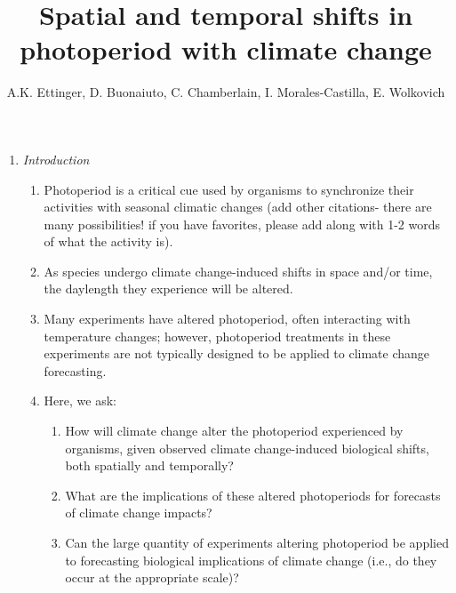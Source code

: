 \documentclass{article}
\begin{document}
 
\title{Spatial and temporal shifts in photoperiod with climate change} %

\author{A.K. Ettinger, D. Buonaiuto, C. Chamberlain, I. Morales-Castilla, E. Wolkovich}
\maketitle  %
\begin{enumerate}
\item \textit{Introduction}
\begin{enumerate}
\item Photoperiod is a critical cue used by organisms to synchronize their activities with seasonal climatic changes (add other citations- there are many possibilities! if you have favorites, please add along with 1-2 words of what the activity is)\citep[e.g.,][]{Hsu:2011,Singh:2017,Basler:2012,Flynn:2018}.
\item As species undergo climate change-induced shifts in space and/or time, the daylength they experience will be altered. 
\item Many experiments have altered photoperiod, often interacting with temperature changes; however, photoperiod treatments in these experiments are not typically designed to be applied to climate change forecasting. 
\item Here, we ask: 
\begin{enumerate}
\item How will climate change alter the photoperiod experienced by organisms, given observed climate change-induced biological shifts, both spatially and temporally?
\item What are the implications of these altered photoperiods for forecasts of climate change impacts?
\item Can the large quantity of experiments altering photoperiod be applied to forecasting biological implications of climate change (i.e., do they occur at the appropriate scale)?
\end{enumerate}
\end{enumerate}


\end{enumerate}
\end{document}
